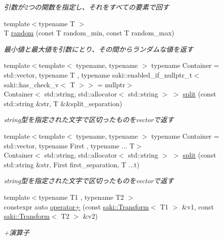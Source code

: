 \begin{DoxyCompactItemize}
\begin{DoxyCompactList}\small\item\em 引数が2つの関数を指定し、それをすべての要素で回す \end{DoxyCompactList}\item 
{\footnotesize template$<$typename T $>$ }\\T \mbox{\hyperlink{namespacesaki_a636caf16f2f00cb734cc867646ac233f}{random}} (const T random\+\_\+min, const T random\+\_\+max)
\begin{DoxyCompactList}\small\item\em 最小値と最大値を引数にとり、その間からランダムな値を返す \end{DoxyCompactList}\item 
{\footnotesize template$<$template$<$ typename, typename $>$ typename Container = std\+::vector, typename T , typename saki\+::enabled\+\_\+if\+\_\+nullptr\+\_\+t$<$ saki\+::has\+\_\+check\+\_\+v$<$ T $>$$>$  = nullptr$>$ }\\Container$<$ std\+::string, std\+::allocator$<$ std\+::string $>$ $>$ \mbox{\hyperlink{namespacesaki_ad15185db28f6e77d65411ca83f64f5bb}{split}} (const std\+::string \&str, T \&\&split\+\_\+separation)
\begin{DoxyCompactList}\small\item\em string型を指定された文字で区切ったものをvectorで返す \end{DoxyCompactList}\item 
{\footnotesize template$<$template$<$ typename, typename $>$ typename Container = std\+::vector, typename First , typename ... T$>$ }\\Container$<$ std\+::string, std\+::allocator$<$ std\+::string $>$ $>$ \mbox{\hyperlink{namespacesaki_ac1464436ac78ade2ba14371e2efe1fd2}{split}} (const std\+::string \&str, First first\+\_\+separation, T ...t)
\begin{DoxyCompactList}\small\item\em string型を指定された文字で区切ったものをvectorで返す \end{DoxyCompactList}\item 
{\footnotesize template$<$typename T1 , typename T2 $>$ }\\constexpr auto \mbox{\hyperlink{namespacesaki_afaf794508bac90671fcdf32ce337f966}{operator+}} (const \mbox{\hyperlink{classsaki_1_1_transform}{saki\+::\+Transform}}$<$ T1 $>$ \&v1, const \mbox{\hyperlink{classsaki_1_1_transform}{saki\+::\+Transform}}$<$ T2 $>$ \&v2)
\begin{DoxyCompactList}\small\item\em +演算子 \end{DoxyCompactList}\item 

\end{DoxyCompactItemize}
